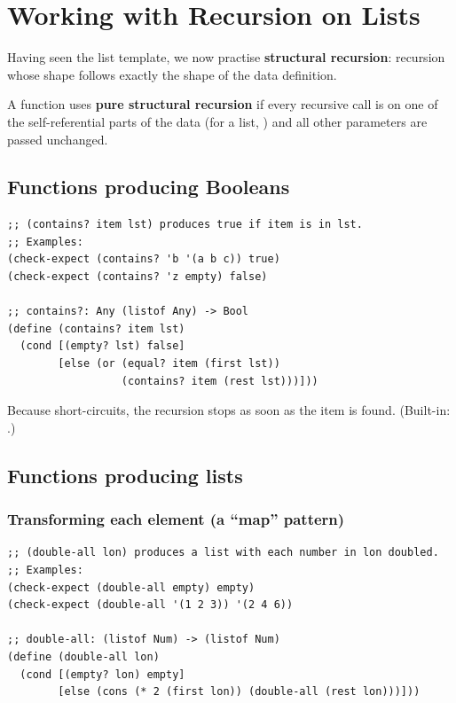 \chapter{Working with Recursion on Lists}

Having seen the list template, we now practise \textbf{structural recursion}:
recursion whose shape follows exactly the shape of the data definition.

\begin{definition}
A function uses \textbf{pure structural recursion} if every recursive call is
on one of the self-referential parts of the data (for a list, )
and all other parameters are passed unchanged.
\end{definition}

\section{Functions producing Booleans}

\begin{lstlisting}[style=racket]
;; (contains? item lst) produces true if item is in lst.
;; Examples:
(check-expect (contains? 'b '(a b c)) true)
(check-expect (contains? 'z empty) false)

;; contains?: Any (listof Any) -> Bool
(define (contains? item lst)
  (cond [(empty? lst) false]
        [else (or (equal? item (first lst))
                  (contains? item (rest lst)))]))
\end{lstlisting}
Because  short-circuits, the recursion stops as soon as the item is
found. (Built-in: .)

\section{Functions producing lists}

\subsection{Transforming each element (a ``map'' pattern)}
\begin{lstlisting}[style=racket]
;; (double-all lon) produces a list with each number in lon doubled.
;; Examples:
(check-expect (double-all empty) empty)
(check-expect (double-all '(1 2 3)) '(2 4 6))

;; double-all: (listof Num) -> (listof Num)
(define (double-all lon)
  (cond [(empty? lon) empty]
        [else (cons (* 2 (first lon)) (double-all (rest lon)))]))
\end{lstlisting}

